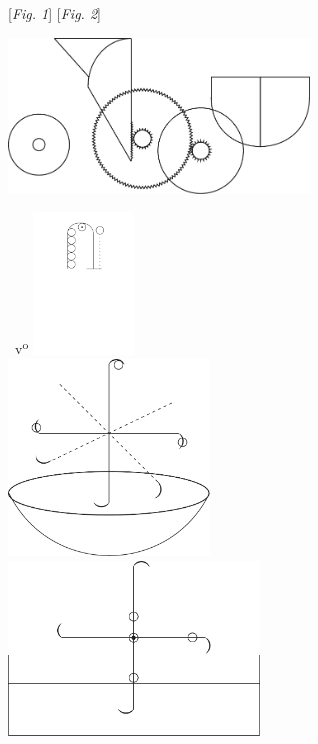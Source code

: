 \hspace*{23.5mm} [\textit{Fig. 1}]\hspace*{62.5mm} [\textit{Fig. 2}]
\vspace*{0.8em}
\pend
\pstart
\noindent
\begin{center}
\hspace{13mm}\includegraphics[width=0.6\textwidth]{images/LH035,02,01_273-d3.pdf}
\end{center}
\pend
\newpage
\pstart
\noindent{}~v\textsuperscript{o}\rbrack
\pend
\pstart
\noindent
\centering
\includegraphics[trim = 0mm -2mm 0mm 0mm, clip, width=0.2\textwidth]{images/LH035,02,01_273-d4.pdf}\\
\pend
\vspace{1.4em}
\pstart
\noindent
\centering
\includegraphics[trim = 0mm -2mm 0mm 0mm, clip, width=0.4\textwidth]{images/LH035,02,01_273-d5.pdf}\\
\pend
\vspace{1.4em}
\pstart
\noindent
\centering
\includegraphics[trim = 0mm -2mm 0mm 0mm, clip, width=0.5\textwidth]{images/LH035,02,01_273-d6.pdf}\\
